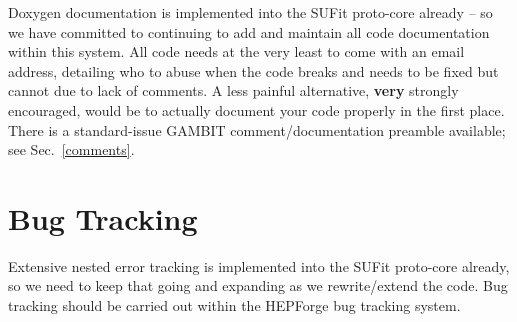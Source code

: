 Doxygen documentation is implemented into the SUFit proto-core already -- so we have committed to continuing to add and maintain all code documentation within this system.  All code needs at the very least to come with an email address, detailing who to abuse when the code breaks and needs to be fixed but cannot due to lack of comments.  A less painful alternative, \textbf{very} strongly encouraged, would be to actually document your code properly in the first place.  There is a standard-issue GAMBIT comment/documentation preamble available; see Sec.~\ref{comments}.

\section{Bug Tracking}

Extensive nested error tracking is implemented into the SUFit proto-core already, so we need to keep that going and expanding as we rewrite/extend the code.  Bug tracking should be carried out within the HEPForge bug tracking system.



